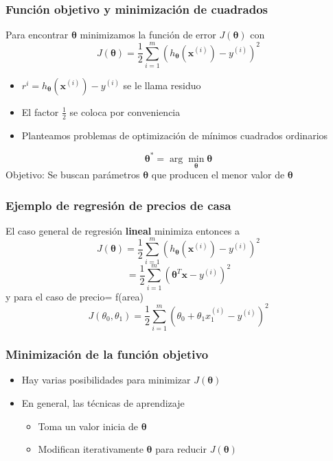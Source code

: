 \documentclass[spanish]{beamer}
\begin{document}
\begin{frame}
\frametitle{Función objetivo y minimización de cuadrados}
Para encontrar $\boldsymbol{\theta}$ minimizamos la función de error $J(\boldsymbol{\theta})$ con 
\begin{equation*}
J(\boldsymbol{\theta}) = \frac{1}{2} \sum_{i=1}^{m} ( h_{\boldsymbol{\theta}}(\mathbf{x}^{(i)})- y^{(i)} )^2
\end{equation*}
\begin{itemize}
\item $r^{i}= h_{\boldsymbol{\theta}}(\mathbf{x}^{(i)})- y^{(i)}$ se le llama residuo
\item El factor  $\frac{1}{2}$ se coloca por conveniencia 
\item Planteamos problemas de optimización de mínimos cuadrados ordinarios 
\end{itemize}
\begin{equation*}
 \boldsymbol{\theta}^{*}= \arg\min_{\boldsymbol{\theta}} \boldsymbol{\theta}
\end{equation*}
Objetivo:
Se buscan parámetros $\boldsymbol{\theta}$ que producen el menor valor de $\boldsymbol{\theta}$

\end{frame}


\begin{frame}
\frametitle{Ejemplo de regresión de precios de casa}

El caso general de regresión \textbf{lineal} minimiza entonces a 
\begin{equation*}
J(\boldsymbol{\theta}) = \frac{1}{2} \sum_{i=1}^{m} ( h_{\boldsymbol{\theta}}(\mathbf{x}^{(i)})- y^{(i)} )^2
\end{equation*}
   \begin{equation*}
= \frac{1}{2} \sum_{i=1}^{m} ( \boldsymbol{\theta}^T  \mathbf{x} - y^{(i)} )^2
\end{equation*}
y para el caso de precio= f(area) 
\begin{equation*}
J(\theta_0,\theta_1) = \frac{1}{2}  \sum_{i=1}^{m}  ( \theta_0+\theta_1 x_{1}^{(i)} - y^{(i)} )^2
\end{equation*}    
\end{frame}

\begin{frame}
\frametitle{Minimización de la función objetivo}
\begin{itemize}
\item Hay varias posibilidades para minimizar $J(\boldsymbol{\theta})$
\item En general, las técnicas de aprendizaje 
\begin{itemize}
\item Toma un valor inicia de $\boldsymbol{\theta}$ 
\item Modifican iterativamente $\boldsymbol{\theta}$  para reducir $J(\boldsymbol{\theta})$
\end{itemize}
\end{itemize}
\end{frame}
\end{document}

